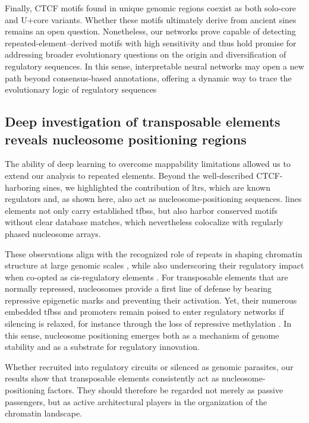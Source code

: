 \documentclass[11pt]{book}
\begin{document}
Finally, CTCF motifs found in unique genomic regions coexist as both solo-core and U+core variants. Whether these motifs ultimately derive from ancient \glspl{sine} remains an open question. Nonetheless, our networks prove capable of detecting repeated-element–derived motifs with high sensitivity and thus hold promise for addressing broader evolutionary questions on the origin and diversification of regulatory sequences. In this sense, interpretable neural networks may open a new path beyond consensus-based annotations, offering a dynamic way to trace the evolutionary logic of regulatory sequences

\subsection{Deep investigation of transposable elements reveals nucleosome positioning regions}
The ability of deep learning to overcome mappability limitations allowed us to extend our analysis to repeated elements. Beyond the well-described CTCF-harboring \glspl{sine}, we highlighted the contribution of \glspl{ltr}, which are known regulators and, as shown here, also act as nucleosome-positioning sequences. \Glspl{line} elements not only carry established \glspl{tfbs}, but also harbor conserved motifs without clear database matches, which nevertheless colocalize with regularly phased nucleosome arrays.

These observations align with the recognized role of repeats in shaping chromatin structure at large genomic scales \cite{cournac_3d_2016}, while also underscoring their regulatory impact when co-opted as cis-regulatory elements \cite{chuong_regulatory_2017}. For transposable elements that are normally repressed, nucleosomes provide a first line of defense by bearing repressive epigenetic marks and preventing their activation. Yet, their numerous embedded \glspl{tfbs} and promoters remain poised to enter regulatory networks if silencing is relaxed, for instance through the loss of repressive methylation \cite{pelinski_nf-b_2022}. In this sense, nucleosome positioning emerges both as a mechanism of genome stability and as a substrate for regulatory innovation.

Whether recruited into regulatory circuits or silenced as genomic parasites, our results show that transposable elements consistently act as nucleosome-positioning factors. They should therefore be regarded not merely as passive passengers, but as active architectural players in the organization of the chromatin landscape.
\end{document}
